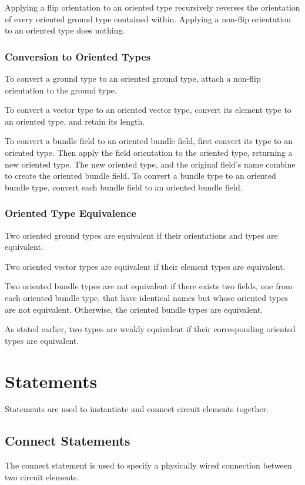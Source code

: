 \documentclass[12pt]{article}
\begin{document}
Applying a flip orientation to an oriented type recursively reverses the orientation of every oriented ground type contained within. Applying a non-flip orientation to an oriented type does nothing.

\subsubsection{Conversion to Oriented Types}
To convert a ground type to an oriented ground type, attach a non-flip orientation to the ground type. 

To convert a vector type to an oriented vector type, convert its element type to an oriented type, and retain its length. 

To convert a bundle field to an oriented bundle field, first convert its type to an oriented type. Then apply the field orientation to the oriented type, returning a new oriented type. The new oriented type, and the original field's name combine to create the oriented bundle field. To convert a bundle type to an oriented bundle type, convert each bundle field to an oriented bundle field.

\subsubsection{Oriented Type Equivalence}
Two oriented ground types are equivalent if their orientations and types are equivalent.

Two oriented vector types are equivalent if their element types are equivalent.

Two oriented bundle types are not equivalent if there exists two fields, one from each oriented bundle type, that have identical names but whose oriented types are not equivalent. Otherwise, the oriented bundle types are equivalent.

As stated earlier, two types are weakly equivalent if their corresponding oriented types are equivalent.


\section{Statements} \label{statements}

Statements are used to instantiate and connect circuit elements together.

\subsection{Connect Statements}
The connect statement is used to specify a physically wired connection between two circuit elements.
\end{document}
